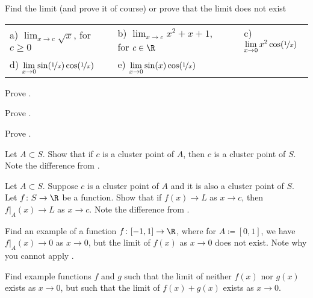 \begin{exercise}
Find the limit (and prove it of course) or prove that the limit does not exist

\medskip

\noindent
\begin{tabular}{lllll}
a)
$\displaystyle
\lim_{x\to c} \sqrt{x}
$, for $c \geq 0$
& &
b)
$\displaystyle
\lim_{x\to c} x^2+x+1
$, for $c \in \R$
& &
c)
$\displaystyle
\lim_{x\to 0} x^2 \cos (\nicefrac{1}{x})
$
\\
d)
$\displaystyle
\lim_{x\to 0} \sin(\nicefrac{1}{x}) \cos (\nicefrac{1}{x})
$
& &
e)
$\displaystyle
\lim_{x\to 0} \sin(x) \cos (\nicefrac{1}{x})
$ & 
\end{tabular}
\end{exercise}

\begin{exercise}
Prove .
\end{exercise}

\begin{exercise}
Prove .
\end{exercise}

\begin{exercise}
Prove .
\end{exercise}

\begin{exercise}
Let $A \subset S$.  Show that if $c$ is a cluster point of $A$, then $c$
is a cluster point of $S$.  Note the difference from
.
\end{exercise}

\begin{exercise} \label{exercise:restrictionlimitexercise}
Let $A \subset S$.  Suppose $c$ is a cluster point of $A$ and
it is also a cluster point of $S$.
Let $f \colon S \to \R$ be a function.  Show that if
$f(x) \to L$ as $x \to c$, then
$f|_A(x) \to L$ as $x \to c$.
Note the difference from
.
\end{exercise}

\begin{exercise}
Find an example of a function $f \colon [-1,1] \to \R$, where for
$A\coloneqq [0,1]$, we have
$f|_A(x) \to 0$ as $x \to 0$, but the limit of $f(x)$ as $x \to 0$
does not exist.  Note why you cannot apply
.
\end{exercise}

\begin{exercise}
Find example functions $f$ and $g$ such that the limit of neither $f(x)$
nor $g(x)$ exists as $x \to 0$, but such that the limit of $f(x)+g(x)$ exists
as $x \to 0$.
\end{exercise}


